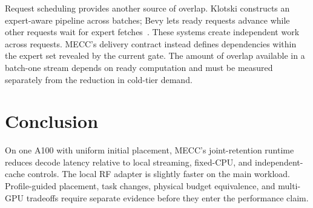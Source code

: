 \documentclass[conference,9pt,letterpaper]{IEEEtran}
\begin{document}
Request scheduling provides another source of overlap. Klotski constructs an expert-aware pipeline across batches; Bevy lets ready requests advance while other requests wait for expert fetches~\cite{klotski,bevy}. These systems create independent work across requests. MECC's delivery contract instead defines dependencies within the expert set revealed by the current gate. The amount of overlap available in a batch-one stream depends on ready computation and must be measured separately from the reduction in cold-tier demand.

\section{Conclusion}
On one A100 with uniform initial placement, MECC's joint-retention runtime reduces decode latency relative to local streaming, fixed-CPU, and independent-cache controls. The local RF adapter is slightly faster on the main workload. Profile-guided placement, task changes, physical budget equivalence, and multi-GPU tradeoffs require separate evidence before they enter the performance claim.

\clearpage
\nobalance
{}


\end{document}
